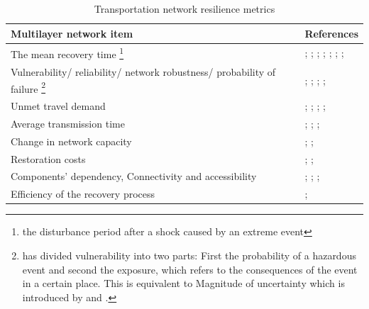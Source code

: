 \documentclass[11pt,twoside]{article}
\numberwithin{equation}{section}
\newcommand{\?}{\stackrel{?}{=}}
\begin{document}
\begin{table}[h!]
  \begin{center}
    \scriptsize
    \caption{Transportation network resilience metrics}
    \label{table.metrics}
    \begin{tabular}{p{2in} p{3.5in}}\toprule
      \textbf{Multilayer network item } & \textbf{References}\\ \midrule
      The mean recovery time \footnote{the disturbance period after a shock
      caused by an extreme event} & \citet{aydin2018framework}; \citet{ahmed2020resilience}; \citet{fang2016resiliencebased}; \cite{almoghathawi2019component}; \citet{baroud2014inherent}; \citet{zhang2017resiliencebased}; \citet{ilbeigi2019statistical}; \citet{pant2014static}  \\\midrule
      Vulnerability/ reliability/ network robustness/ probability of failure \footnote {\citet{jenelius2006importance} has divided vulnerability into two parts: First the probability of a hazardous event and second the exposure, which refers to the consequences of the event in a certain place. This is equivalent to Magnitude of uncertainty which is introduced by \citet{aydin2018framework} and \citet{kermanshah2017robustness}.} &  \citet{aydin2018framework};  \citet{ahmed2020resilience};  \citet{jenelius2006importance};  \citet{almoghathawi2019component};  \citet{zhang2016resiliencebased} \\\midrule
      Unmet travel demand & \citet{ahmed2020resilience}; \citet{jenelius2006importance}; \citet{bhatia2015network}; \citet{kermanshah2017robustness}; \citet{tingting2020transportation}  \\\midrule
      Average transmission time & \citet{ahmed2020resilience}; \citet{wu2020traffic}; \citet{tingting2020transportation}; \citet{jenelius2006importance} \\\midrule
      Change in network capacity  & \citet{wu2020traffic}; \citet{ahmed2020resilience}; \citet{jenelius2006importance}  \\\midrule
      Restoration costs & \citet{aydin2018framework}; \citet{ahmed2020resilience}; \citet{baroud2014inherent}  \\\midrule
      Components' dependency, Connectivity and accessibility & \citet{ahmed2020resilience}; \citet{bhatia2015network}; \citet{jenelius2006importance}; \citet{mattsson2015vulnerability}  \\\midrule
      Efficiency of the recovery process & \citet{aydin2018framework}; \citet{zhang2017resiliencebased}  \\\midrule

\end{tabular}
\end{center}
\end{table}
\end{document}
